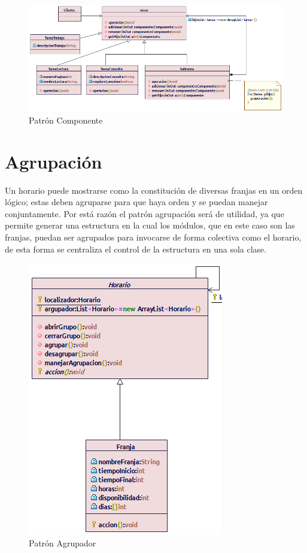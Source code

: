 \begin{figure}[H]
	\centering
	\includegraphics[width=1\linewidth]{diseno/patrones/imgs/Composite}
	\caption{Patrón Componente}
	\label{fig:gantt}
\end{figure}

\section{Agrupación}
Un horario puede mostrarse como la constitución de diversas franjas en un orden lógico; estas deben agruparse para que haya orden y se puedan manejar conjuntamente. Por está razón el patrón agrupación será de utilidad, ya que permite generar una estructura en la cual los módulos, que en este caso son las franjas, puedan ser agrupados para invocarse de forma colectiva como el horario, de esta forma se centraliza el control de la estructura en una sola clase.

\begin{figure}[H]
	\centering
	\includegraphics[width=0.5\linewidth]{diseno/patrones/imgs/Agrupador}
	\caption{Patrón Agrupador}
	\label{fig:gantt}
\end{figure}

